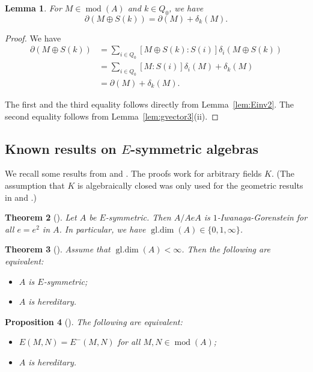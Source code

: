 \documentclass[12pt,reqno]{amsart}
\newtheorem{Thm}{Theorem}[section]
\newtheorem{Lem}[Thm]{Lemma}
\newtheorem{Prop}[Thm]{Proposition}
\theoremstyle{definition}
\newcommand{\md}{\operatorname{mod}}
\newcommand{\gldim}{\operatorname{gl.dim}}
\begin{document}
\begin{Lem}\label{lem:Einv3}
For $M \in \md(A)$ and $k \in Q_0$, we have
$$
\partial(M \oplus S(k)) = \partial(M) + \delta_k(M).
$$
\end{Lem}

\begin{proof}
We have 
\begin{align*}
\partial(M \oplus S(k)) &= \sum_{i \in Q_0} [M \oplus S(k) :S(i)] \delta_i(M \oplus S(k))
\\
&= \sum_{i \in Q_0} [M:S(i)] \delta_i(M) + \delta_k(M)
\\
&= \partial(M) + \delta_k(M).
\end{align*}

The first and the third equality follows directly from Lemma~\ref{lem:Einv2}.
The second equality follows from 
Lemma~\ref{lem:gvector3}(ii).
\end{proof}

\subsection{Known results on $E$-symmetric algebras}

We recall some results from \cite{BS25} and \cite{BS26}.
The proofs work for arbitrary fields $K$.
(The assumption that $K$ is algebraically closed was only used for the geometric results in \cite{BS25} and \cite{BS26}.)

\begin{Thm}[{\cite[Theorem~1.7]{BS25}}]\label{thm:BS1}
Let $A$ be $E$-symmetric.
Then $A/AeA$ is $1$-Iwanaga-Gorenstein for all $e=e^2$ in $A$. In particular, we have
$\gldim(A) \in \{ 0, 1, \infty \}$.
\end{Thm}

\begin{Thm}[{\cite[Corollary~1.8]{BS25}}]\label{thm:BS2}
Assume that $\gldim(A) < \infty$.
Then the following are equivalent:
\begin{itemize}\itemsep2mm

\item[(i)]
$A$ is $E$-symmetric;

\item[(ii)]
$A$ is hereditary.

\end{itemize}
\end{Thm}

\begin{Prop}[{\cite[Proposition~3.2]{BS26}}]\label{prop:BS3}
The following are equivalent:
\begin{itemize}\itemsep2mm

\item[(i)]
$E(M,N) = E^-(M,N)$ for all $M,N \in \md(A)$;

\item[(ii)]
$A$ is hereditary.

\end{itemize}
\end{Prop}
\end{document}
